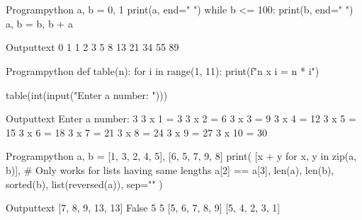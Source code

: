 \documentclass[11pt]{ipu-python}
\begin{document}
    \\~\\
    \begin{code}
        {Program}{python}
a, b = 0, 1
print(a, end=" ")
while b <= 100:
    print(b, end=" ")
    a, b = b, b + a
    \end{code}
    \begin{code}
        {Output}{text}
0 1 1 2 3 5 8 13 21 34 55 89
    \end{code}
    \vfill

    \newpage
    \begin{code}
        {Program}{python}
def table(n):
    for i in range(1, 11):
        print(f"{n} x {i} = {n * i}")


table(int(input("Enter a number: ")))
    \end{code}
    \begin{code}
        {Output}{text}
Enter a number: 3
3 x 1 = 3
3 x 2 = 6
3 x 3 = 9
3 x 4 = 12
3 x 5 = 15
3 x 6 = 18
3 x 7 = 21
3 x 8 = 24
3 x 9 = 27
3 x 10 = 30
    \end{code}

    \begin{code}
        {Program}{python}
a, b = [1, 3, 2, 4, 5], [6, 5, 7, 9, 8]
print(
    [x + y for x, y in zip(a, b)],  # Only works for lists having same lengths
    a[2] == a[3],
    len(a), len(b),
    sorted(b),
    list(reversed(a)),
    sep="\n"
)
    \end{code}
    \newpage
    \begin{code}
        {Output}{text}
[7, 8, 9, 13, 13]
False
5
5
[5, 6, 7, 8, 9]
[5, 4, 2, 3, 1]
    \end{code}
\end{document}
